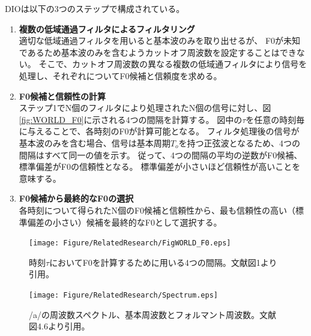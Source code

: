 DIOは以下の3つのステップで構成されている。
\begin{enumerate}
    \item \textbf{複数の低域通過フィルタによるフィルタリング}\mbox{}\\
            適切な低域通過フィルタを用いると基本波のみを取り出せるが、
            F0が未知であるため基本波のみを含むようカットオフ周波数を設定することはできない。
            そこで、カットオフ周波数の異なる複数の低域通フィルタにより信号を処理し、それぞれについてF0候補と信頼度を求める。
    \item \textbf{F0候補と信頼性の計算}\mbox{}\\
            ステップ1でN個のフィルタにより処理されたN個の信号に対し、図\ref{fig:WORLD_F0}に示される4つの間隔を計算する。
            図中の$\tau$を任意の時刻毎に与えることで、各時刻のF0が計算可能となる。
            フィルタ処理後の信号が基本波のみを含む場合、信号は基本周期$T_o$を持つ正弦波となるため、4つの間隔はすべて同一の値を示す。
            従って、4つの間隔の平均の逆数がF0候補、標準偏差がF0の信頼性となる。
            標準偏差が小さいほど信頼性が高いことを意味する。
    \item \textbf{F0候補から最終的なF0の選択}\mbox{}\\
            各時刻について得られたN個のF0候補と信頼性から、最も信頼性の高い（標準偏差の小さい）候補を最終的なF0として選択する。

\end{enumerate}


\begin{figure}[h]
    \begin{minipage}[b]{0.5\hsize}
        \vspace{50pt}
        \centering
        \texttt{[image: Figure/RelatedResearch/FigWORLD\_F0.eps]}
        \caption{時刻$\tau$においてF0を計算するために用いる4つの間隔。文献\cite{morise2016Kihonha}図1より引用。}
        \label{fig:WORLD_F0}
    \end{minipage}
    \hspace{0.05\hsize}
    \begin{minipage}[b]{0.5\hsize}
        \vspace{50pt}
        \centering
        \texttt{[image: Figure/RelatedResearch/Spectrum.eps]}
        \caption{/a/の周波数スペクトル、基本周波数とフォルマント周波数。文献\cite{Suzuki2011nyuumon}図4.6より引用。}
        \label{fig:Spectrum}
    \end{minipage}
    
\end{figure}



